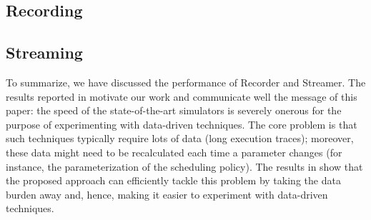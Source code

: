 \subsection{Recording}


\subsection{Streaming}


To summarize, we have discussed the performance of Recorder and Streamer. The
results reported in  motivate our work and communicate well the
message of this paper: the speed of the state-of-the-art simulators is severely
onerous for the purpose of experimenting with data-driven techniques. The core
problem is that such techniques typically require lots of data (long execution
traces); moreover, these data might need to be recalculated each time a
parameter changes (for instance, the parameterization of the scheduling policy).
The results in  show that the proposed approach can efficiently
tackle this problem by taking the data burden away and, hence, making it easier
to experiment with data-driven techniques.
